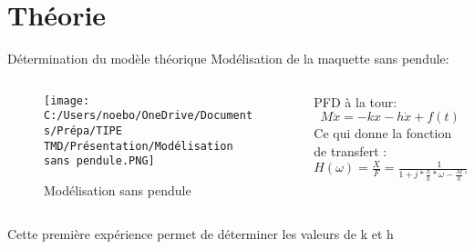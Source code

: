 \documentclass{beamer}
\begin{document}
\section{Théorie}

\begin{frame}{Détermination du modèle théorique}
 Modélisation de la maquette sans pendule:\vspace{12 pt}
	\begin{columns}
		\begin{column}{0.5\textwidth}
			\begin{figure}
				\texttt{[image: C:/Users/noebo/OneDrive/Documents/Prépa/TIPE TMD/Présentation/Modélisation sans pendule.PNG]}
				\caption{Modélisation sans pendule}
			\end{figure}
		\end{column}
		\begin{column}{0.6\textwidth}
			PFD à la tour:
			\begin{equation*}
				M\ddot{x} = -kx -h\dot{x} + f(t)
			\end{equation*}
			Ce qui donne la fonction de transfert : 
			$H(\omega)=\frac{X}{F}=\frac{1}{1+j*\frac{h}{k}*\omega-\frac{M}{k}*\omega^{2}}$
		\end{column}
	\end{columns}
\end{frame}	



	
\begin{frame}
	Cette première expérience permet de déterminer les valeurs de k et h 
\end{frame}
\end{document}
